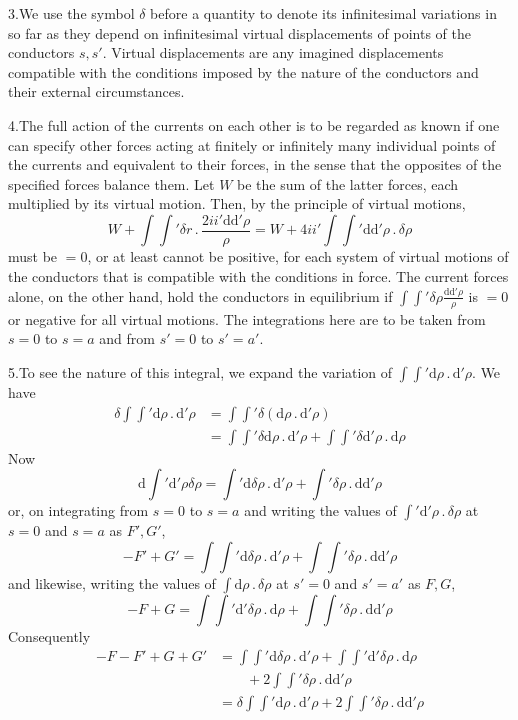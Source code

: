 3.\quad We use the symbol $\delta$ before a quantity to denote its infinitesimal variations in so far as they depend on infinitesimal virtual displacements of points of the conductors $s,s'$. Virtual displacements are any imagined displacements compatible with the conditions imposed by the nature of the conductors and their external circumstances.

4.\quad The full action of the currents on each other is to be regarded as known if one can specify other forces acting at finitely or infinitely many individual points of the currents and equivalent to their forces, in the sense that the opposites of the specified forces balance them. Let $W$ be the sum of the latter forces, each multiplied by its virtual motion. Then, by the principle of virtual motions,
\[
W+\int\int'\delta r\,.\,\frac{2ii'\mathrm d\mathrm d'\rho}{\rho}=W+4ii'\int\int'\mathrm d\mathrm d'\rho\,.\,\delta\rho
\]
must be $=0$, or at least cannot be positive, for each system of virtual motions of the conductors that is compatible with the conditions in force. The current forces alone, on the other hand, hold the conductors in equilibrium if $\int\int'\delta\rho\frac{\mathrm d\mathrm d'\rho}{\rho}$ is $=0$ or negative for all virtual motions. The integrations here are to be taken from $s=0$ to $s=a$ and from $s'=0$ to $s'=a'$.

5.\quad To see the nature of this integral, we expand the variation of $\int\int'\mathrm d\rho\,.\,\mathrm d'\rho$. We have
\[
\begin{aligned}
\delta\int\int'\mathrm d\rho\,.\,\mathrm d'\rho&=\int\int'\delta(\mathrm d\rho\,.\,\mathrm d'\rho)\\
&=\int\int'\delta\mathrm d\rho\,.\,\mathrm d'\rho+\int\int'\delta\mathrm d'\rho\,.\,\mathrm d\rho
\end{aligned}
\]
Now
\[
\mathrm d\int'\mathrm d'\rho\delta\rho=\int'\mathrm d\delta\rho\,.\,\mathrm d'\rho+\int'\delta\rho\,.\,\mathrm d\mathrm d'\rho
\]
or, on integrating from $s=0$ to $s=a$ and writing the values of $\int'\mathrm d'\rho\,.\,\delta\rho$ at $s=0$ and $s=a$ as $F',G'$,
\[
-F'+G'=\int\int'\mathrm d\delta\rho\,.\,\mathrm d'\rho+\int\int'\delta\rho\,.\,\mathrm d\mathrm d'\rho
\]
and likewise, writing the values of $\int\mathrm d\rho\,.\,\delta\rho$ at $s'=0$ and $s'=a'$ as $F,G$,
\[
-F+G=\int\int'\mathrm d'\delta\rho\,.\,\mathrm d\rho+\int\int'\delta\rho\,.\,\mathrm d\mathrm d'\rho
\]
Consequently
\[
\begin{aligned}
-F-F'+G+G'&=\int\int'\mathrm d\delta\rho\,.\,\mathrm d'\rho+\int\int'\mathrm d'\delta\rho\,.\,\mathrm d\rho\\
&\qquad+2\int\int'\delta\rho\,.\,\mathrm d\mathrm d'\rho\\
&=\delta\int\int'\mathrm d\rho\,.\,\mathrm d'\rho+2\int\int'\delta\rho\,.\,\mathrm d\mathrm d'\rho
\end{aligned}
\]

